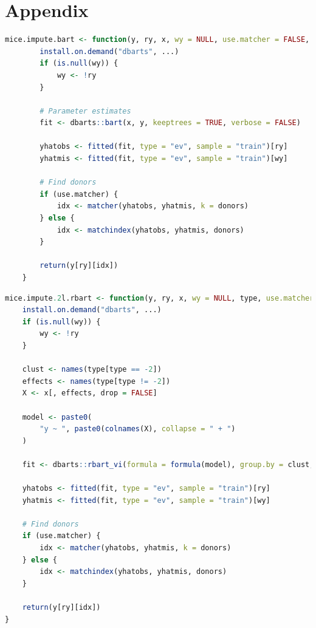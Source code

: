 \documentclass[10pt, a4paper, titlepage]{article}
\begin{document}
\newpage
\section{Appendix}
\begin{lstlisting}[language=R, caption = {Imputation function for single-level BART}, label = {lst:singlelevelBART}]
    mice.impute.bart <- function(y, ry, x, wy = NULL, use.matcher = FALSE, donors = 5L, ...) {
        install.on.demand("dbarts", ...)
        if (is.null(wy)) {
            wy <- !ry
        }
    
        # Parameter estimates
        fit <- dbarts::bart(x, y, keeptrees = TRUE, verbose = FALSE)
    
        yhatobs <- fitted(fit, type = "ev", sample = "train")[ry]
        yhatmis <- fitted(fit, type = "ev", sample = "train")[wy]
    
        # Find donors
        if (use.matcher) {
            idx <- matcher(yhatobs, yhatmis, k = donors)
        } else {
            idx <- matchindex(yhatobs, yhatmis, donors)
        }
    
        return(y[ry][idx])
    }
\end{lstlisting}
\begin{lstlisting}[language=R, caption={Imputation function for random intercept BART}, label={lst:randominterceptBART}]
    mice.impute.2l.rbart <- function(y, ry, x, wy = NULL, type, use.matcher = FALSE, donors = 5L, ...) {
    install.on.demand("dbarts", ...)
    if (is.null(wy)) {
        wy <- !ry
    }

    clust <- names(type[type == -2])
    effects <- names(type[type != -2])
    X <- x[, effects, drop = FALSE]

    model <- paste0(
        "y ~ ", paste0(colnames(X), collapse = " + ")
    )

    fit <- dbarts::rbart_vi(formula = formula(model), group.by = clust, data = data.frame(y, x), verbose = FALSE, ...)

    yhatobs <- fitted(fit, type = "ev", sample = "train")[ry]
    yhatmis <- fitted(fit, type = "ev", sample = "train")[wy]

    # Find donors
    if (use.matcher) {
        idx <- matcher(yhatobs, yhatmis, k = donors)
    } else {
        idx <- matchindex(yhatobs, yhatmis, donors)
    }

    return(y[ry][idx])
}
\end{lstlisting}
\end{document}
